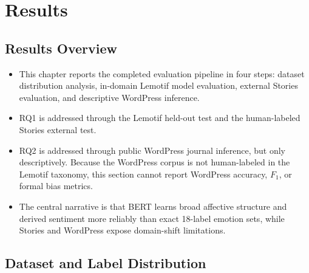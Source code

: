 \section{Results}
\label{sec:results}


\subsection{Results Overview}
\label{subs:results-overview}

\begin{itemize}
    \item This chapter reports the completed evaluation pipeline in four steps: dataset distribution analysis, in-domain Lemotif model evaluation, external Stories evaluation, and descriptive WordPress inference.
    \item RQ1 is addressed through the Lemotif held-out test and the human-labeled Stories external test.
    \item RQ2 is addressed through public WordPress journal inference, but only descriptively. Because the WordPress corpus is not human-labeled in the Lemotif taxonomy, this section cannot report WordPress accuracy, $F_1$, or formal bias metrics.
    \item The central narrative is that BERT learns broad affective structure and derived sentiment more reliably than exact 18-label emotion sets, while Stories and WordPress expose domain-shift limitations.
\end{itemize}

\subsection{Dataset and Label Distribution}
\label{subs:dataset-label-distribution}

